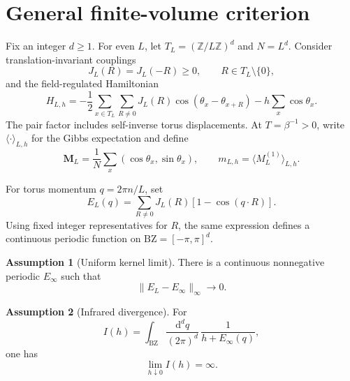\documentclass[aps,prb,twocolumn,groupedaddress,amsmath,amssymb,
               superscriptaddress,nofootinbib,floatfix]{revtex4-2}
\theoremstyle{plain}
\theoremstyle{definition}
\newtheorem{assumption}{Assumption}
\newcommand{\BZ}{\mathrm{BZ}}
\newcommand{\dd}{\mathrm{d}}
\begin{document}
\section{General finite-volume criterion}

Fix an integer $d\ge1$.  For even $L$, let
$T_L=(\mathbb Z/L\mathbb Z)^d$ and $N=L^d$.  Consider
translation-invariant couplings
\begin{equation}
 J_L(R)=J_L(-R)\ge0,
 \qquad R\in T_L\setminus\{0\},
\label{eq:general-coupling}
\end{equation}
and the field-regulated Hamiltonian
\begin{equation}
 H_{L,h}
 =
 -\frac12\sum_{x\in T_L}\sum_{R\ne0}
 J_L(R)\cos(\theta_x-\theta_{x+R})
 -h\sum_x\cos\theta_x .
\label{eq:general-H}
\end{equation}
The pair factor includes self-inverse torus displacements.  At
$T=\beta^{-1}>0$, write $\langle\cdot\rangle_{L,h}$ for the Gibbs
expectation and define
\begin{equation}
 \bm M_L=\frac1N\sum_x(\cos\theta_x,\sin\theta_x),
 \qquad
 m_{L,h}=\langle M_L^{(1)}\rangle_{L,h}.
\label{eq:general-M}
\end{equation}

For torus momentum $q=2\pi n/L$, set
\begin{equation}
 E_L(q)=
 \sum_{R\ne0}J_L(R)[1-\cos(q\cdot R)].
\label{eq:general-kernel}
\end{equation}
Using fixed integer representatives for $R$, the same expression defines a
continuous periodic function on $\BZ=[-\pi,\pi]^d$.

\begin{assumption}[Uniform kernel limit]
\label{ass:uniform}
There is a continuous nonnegative periodic $E_\infty$ such that
\begin{equation}
 \|E_L-E_\infty\|_\infty\longrightarrow0.
\label{eq:uniform-assumption}
\end{equation}
\end{assumption}

\begin{assumption}[Infrared divergence]
\label{ass:infrared}
For
\begin{equation}
 I(h)=
 \int_\BZ\frac{\dd^dq}{(2\pi)^d}\,
 \frac1{h+E_\infty(q)},
\label{eq:Ih}
\end{equation}
one has
\begin{equation}
 \lim_{h\downarrow0}I(h)=\infty.
\label{eq:Ih-diverges}
\end{equation}
\end{assumption}
\end{document}
